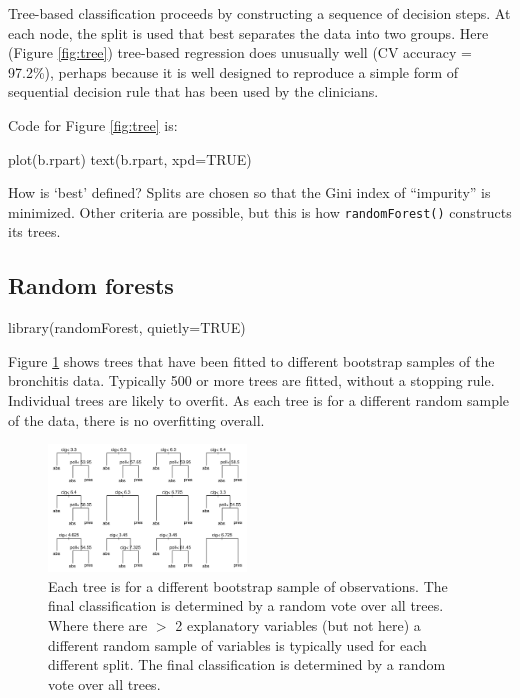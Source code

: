 \documentclass{tufte-book}\usepackage[]{graphicx}\usepackage[]{color}
\newcommand{\txtt}[1]{\texttt{#1}}
\begin{document}
Tree-based classification proceeds by constructing a sequence of
decision steps. At each node, the split is used that best separates
the data into two groups.  Here (Figure \ref{fig:tree}) tree-based
regression does unusually well (CV accuracy = 97.2\%), perhaps because
it is well designed to reproduce a simple form of sequential decision
rule that has been used by the clinicians.

\begin{marginfigure}
Code for Figure \ref{fig:tree} is:
\begin{Schunk}
\begin{Sinput}
plot(b.rpart)
text(b.rpart, xpd=TRUE)
\end{Sinput}
\end{Schunk}
\end{marginfigure}

How is `best' defined? Splits are chosen so that the Gini index of
``impurity'' is minimized.  Other criteria are possible, but this is
how \txtt{randomForest()} constructs its trees.

\subsection{Random forests}

\begin{Schunk}
\begin{Sinput}
library(randomForest, quietly=TRUE)
\end{Sinput}
\end{Schunk}

Figure \ref{fig:brontrees} shows trees that have been fitted to
different bootstrap samples of the bronchitis data.  Typically 500 or
more trees are fitted, without a stopping rule.  Individual trees are
likely to overfit.  As each tree is for a different random sample of
the data, there is no overfitting overall.

\begin{figure}
\begin{Schunk}


\centerline{\includegraphics[width=0.47\textwidth]{figs/12-rf-x-bronchit-1} }

\end{Schunk}
\caption{Each tree is for a different bootstrap sample of
  observations.  The final classification is determined by a random
  vote over all trees.  Where there are $>$ 2 explanatory variables
  (but not here) a different random sample of variables is typically
  used for each different split. The final classification is
  determined by a random vote over all trees.}\label{fig:brontrees}
\end{figure}
\end{document}
